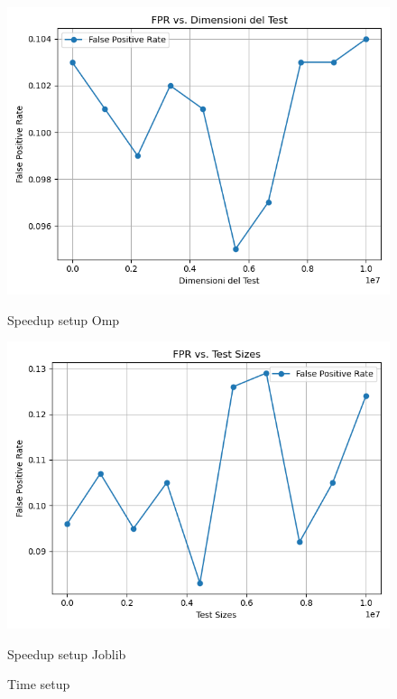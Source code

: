 \documentclass[11pt]{article}
\begin{document}
    \begin{figure}[H]
        \centering
        \includegraphics[width=\linewidth]{omp/010/setup_fpr_plot}
            \caption{Speedup setup Omp}\label{fig:010-setup_fpr_omp}
        \endminipage\hfill
        \includegraphics[width=\linewidth]{joblib/010/setup_fpr_plot}
            \caption{Speedup setup Joblib}\label{fig:010-setup_fpr_joblib}
        \endminipage\hfill
        \caption{Time setup}
    \end{figure}
\end{document}
